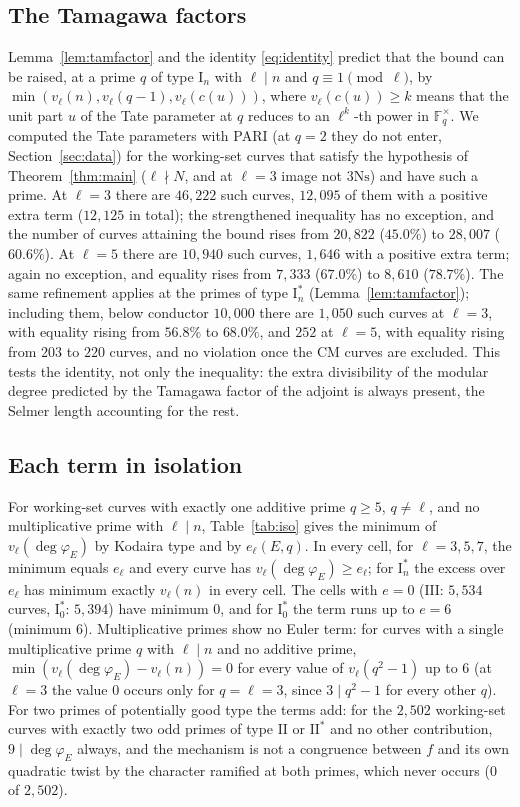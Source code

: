 \documentclass[11pt]{amsart}
\theoremstyle{definition}
\newcommand{\F}{\mathbb{F}}
\newcommand{\degphi}{\deg\varphi_E}
\newcommand{\Ns}{3\mathrm{Ns}}
\begin{document}
\subsection{The Tamagawa factors}\label{sec:tam}
Lemma~\ref{lem:tamfactor} and the identity \eqref{eq:identity} predict that the bound can be raised, at a prime $q$ of type $\mathrm{I}_n$ with $\ell\mid n$ and $q\equiv1\pmod\ell$, by $\min(v_\ell(n),v_\ell(q-1),v_\ell(c(u)))$, where $v_\ell(c(u))\ge k$ means that the unit part $u$ of the Tate parameter at $q$ reduces to an $\ell^k$-th power in $\F_q^\times$. We computed the Tate parameters with PARI (at $q=2$ they do not enter, Section~\ref{sec:data}) for the working-set curves that satisfy the hypothesis of Theorem~\ref{thm:main} ($\ell\nmid N$, and at $\ell=3$ image not $\Ns$) and have such a prime. At $\ell=3$ there are $46{,}222$ such curves, $12{,}095$ of them with a positive extra term ($12{,}125$ in total); the strengthened inequality has no exception, and the number of curves attaining the bound rises from $20{,}822$ ($45.0\%$) to $28{,}007$ ($60.6\%$). At $\ell=5$ there are $10{,}940$ such curves, $1{,}646$ with a positive extra term; again no exception, and equality rises from $7{,}333$ ($67.0\%$) to $8{,}610$ ($78.7\%$). The same refinement applies at the primes of type $\mathrm{I}_n^*$ (Lemma~\ref{lem:tamfactor}); including them, below conductor $10{,}000$ there are $1{,}050$ such curves at $\ell=3$, with equality rising from $56.8\%$ to $68.0\%$, and $252$ at $\ell=5$, with equality rising from $203$ to $220$ curves, and no violation once the CM curves are excluded. This tests the identity, not only the inequality: the extra divisibility of the modular degree predicted by the Tamagawa factor of the adjoint is always present, the Selmer length accounting for the rest.

\subsection{Each term in isolation}\label{sec:iso}
For working-set curves with exactly one additive prime $q\ge5$, $q\ne\ell$, and no multiplicative prime with $\ell\mid n$, Table~\ref{tab:iso} gives the minimum of $v_\ell(\degphi)$ by Kodaira type and by $e_\ell(E,q)$. In every cell, for $\ell=3,5,7$, the minimum equals $e_\ell$ and every curve has $v_\ell(\degphi)\ge e_\ell$; for $\mathrm{I}_n^*$ the excess over $e_\ell$ has minimum exactly $v_\ell(n)$ in every cell. The cells with $e=0$ ($\mathrm{III}$: $5{,}534$ curves, $\mathrm{I}_0^*$: $5{,}394$) have minimum $0$, and for $\mathrm{I}_0^*$ the term runs up to $e=6$ (minimum $6$). Multiplicative primes show no Euler term: for curves with a single multiplicative prime $q$ with $\ell\mid n$ and no additive prime, $\min(v_\ell(\degphi)-v_\ell(n))=0$ for every value of $v_\ell(q^2-1)$ up to $6$ (at $\ell=3$ the value $0$ occurs only for $q=\ell=3$, since $3\mid q^2-1$ for every other $q$). For two primes of potentially good type the terms add: for the $2{,}502$ working-set curves with exactly two odd primes of type $\mathrm{II}$ or $\mathrm{II}^*$ and no other contribution, $9\mid\degphi$ always, and the mechanism is not a congruence between $f$ and its own quadratic twist by the character ramified at both primes, which never occurs ($0$ of $2{,}502$).
\end{document}

